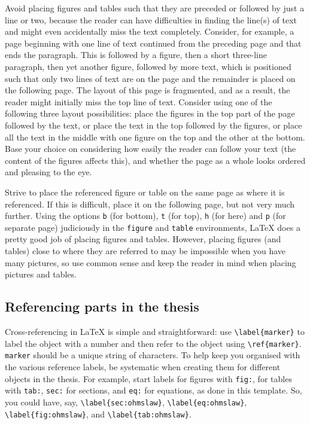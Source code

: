 \documentclass[english, 12pt, a4paper, elec, utf8, a-2b, online]{aaltothesis}
\begin{document}
Avoid placing figures and tables such that they are preceded or followed by just
a line or two, because the reader can have difficulties in finding the line(s) 
of text and might even accidentally miss the text completely. Consider, for 
example, a page beginning with one line of text continued from the preceding 
page and that ends the paragraph. This is followed by a figure, then a short 
three-line paragraph, then yet another figure, followed by more text, which is 
positioned such that only two lines of text are on the page and the remainder is
placed on the following page. The layout of this page is fragmented, and as a 
result, the reader might initially miss the top line of text. Consider using one
of the following three layout possibilities: place the figures in the top part 
of the page followed by the text, or place the text in the top followed by the 
figures, or place all the text in the middle with one figure on the top and the 
other at the bottom. Base your choice on considering how easily the reader can 
follow your text (the content of the figures affects this), and whether the page
as a whole looks ordered and pleasing to the eye.

Strive to place the referenced figure or table on the same page as where it is 
referenced. If this is difficult, place it on the following page, but not very 
much further. Using the options \texttt{b} (for bottom), \texttt{t} (for top), 
\texttt{h} (for here) and \texttt{p} (for separate page) judiciously in the 
\texttt{figure} and \texttt{table} environments, \LaTeX{} does a pretty good 
job of placing figures and tables. However, placing figures (and tables) close 
to where they are referred to may be impossible when you have many pictures, so 
use common sense and keep the reader in mind when placing pictures and tables.


\subsection{Referencing parts in the thesis}

Cross-referencing in \LaTeX{} is simple and straightforward: use 
\verb+\label{marker}+ to label the object with a number and then refer to the 
object using \verb+\ref{marker}+. \texttt{marker} should be a unique string of 
characters. To help keep you organised with the various reference labels, be 
systematic when creating them for different objects in the thesis. For example, 
start labels for figures with \texttt{fig:}, for tables with \texttt{tab:}, 
\texttt{sec:} for sections, and \texttt{eq:} for equations, as done in this 
template. So, you could have, say, \verb+\label{sec:ohmslaw}+, 
\verb+\label{eq:ohmslaw}+, \verb+\label{fig:ohmslaw}+, and 
\verb+\label{tab:ohmslaw}+.
\end{document}
